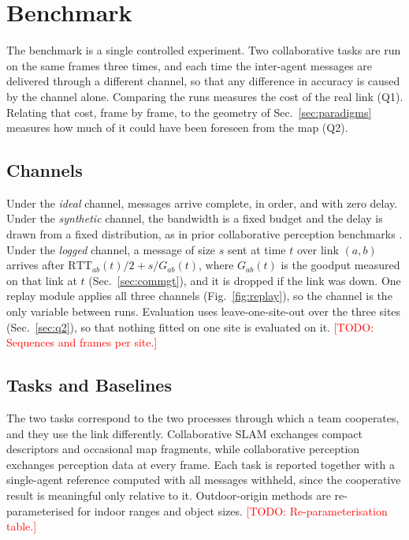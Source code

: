 \documentclass[conference]{IEEEtran}
\newcommand{\todo}[1]{\textcolor{red}{[TODO: #1]}}
\begin{document}
\section{Benchmark}
\label{sec:benchmarks}
The benchmark is a single controlled experiment. Two collaborative
tasks are run on the same frames three times, and each time the
inter-agent messages are delivered through a different channel, so
that any difference in accuracy is caused by the channel alone.
Comparing the runs measures the cost of the real link (Q1). Relating
that cost, frame by frame, to the geometry of Sec.~\ref{sec:paradigms}
measures how much of it could have been foreseen from the map (Q2).

\subsection{Channels}
\label{sec:channels}
Under the \emph{ideal} channel, messages arrive complete, in order,
and with zero delay. Under the \emph{synthetic} channel, the
bandwidth is a fixed budget and the delay is drawn from a fixed
distribution, as in prior collaborative perception benchmarks
\cite{where2comm,v2xvit}. Under the \emph{logged} channel, a message
of size $s$ sent at time $t$ over link $(a,b)$ arrives after
$\mathrm{RTT}_{ab}(t)/2 + s/G_{ab}(t)$, where $G_{ab}(t)$ is the
goodput measured on that link at $t$ (Sec.~\ref{sec:commgt}), and it
is dropped if the link was down. One replay module applies all three
channels (Fig.~\ref{fig:replay}), so the channel is the only
variable between runs. Evaluation uses leave-one-site-out over the
three sites (Sec.~\ref{sec:q2}), so that nothing fitted on one site
is evaluated on it. \todo{Sequences and frames per site.}



\subsection{Tasks and Baselines}
\label{sec:tasks}
The two tasks correspond to the two processes through which a team
cooperates, and they use the link differently. Collaborative SLAM
exchanges compact descriptors and occasional map fragments, while
collaborative perception exchanges perception data at every frame.
Each task is reported together with a single-agent reference computed
with all messages withheld, since the cooperative result is
meaningful only relative to it. Outdoor-origin methods are
re-parameterised for indoor ranges and object sizes.
\todo{Re-parameterisation table.}
\end{document}
